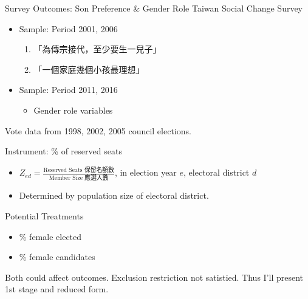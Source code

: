 \documentclass[
  10pt,
  ignorenonframetext,
  aspectratio=43,
]{beamer}
\providecommand{\tightlist}{%
  \setlength{\itemsep}{0pt}\setlength{\parskip}{0pt}}
\begin{document}
\begin{frame}
\begin{block}{Survey Outcomes: Son Preference \& Gender Role}
\protect\hypertarget{survey-outcomes-son-preference-gender-role}{}
Taiwan Social Change Survey

\begin{itemize}
\tightlist
\item
  Sample: Period 2001, 2006

  \begin{enumerate}
  \tightlist
  \item
    「為傳宗接代，至少要生一兒子」
  \item
    「一個家庭幾個小孩最理想」
  \end{enumerate}
\item
  Sample: Period 2011, 2016

  \begin{itemize}
  \tightlist
  \item
    Gender role variables
  \end{itemize}
\end{itemize}
\end{block}
\end{frame}

\begin{frame}
Vote data from 1998, 2002, 2005 council elections.

\begin{block}{Instrument: \% of reserved seats}
\protect\hypertarget{instrument-of-reserved-seats}{}
\begin{itemize}
\tightlist
\item
  \(Z_{ed} = \frac{\text{Reserved Seats 保留名額數}}{\text{Member Size 應選人數}}\),
  in election year \(e\), electoral district \(d\)
\item
  Determined by population size of electoral district.
\end{itemize}
\end{block}

\begin{block}{Potential Treatments}
\protect\hypertarget{potential-treatments}{}
\begin{itemize}
\tightlist
\item
  \% female elected
\item
  \% female candidates
\end{itemize}

Both could affect outcomes. Exclusion restriction not satistied. Thus
I'll present 1st stage and reduced form.
\end{block}
\end{frame}
\end{document}
